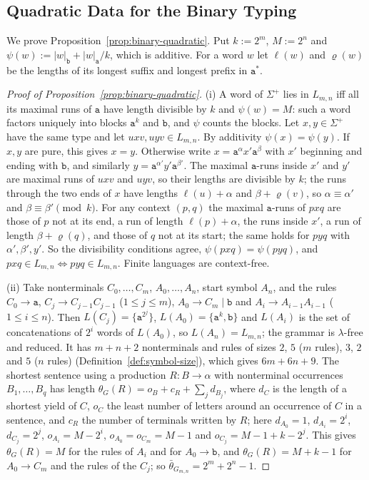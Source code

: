 \documentclass[11pt]{article}
\numberwithin{equation}{section}
\theoremstyle{plain}
\theoremstyle{definition}
\theoremstyle{remark}
\theoremstyle{plain}
\begin{document}
\subsection{Quadratic Data for the Binary Typing}

We prove Proposition~\ref{prop:binary-quadratic}.  Put
$k:=2^m$, $M:=2^n$ and $\psi(w):=|w|_{\mathtt b}+|w|_{\mathtt a}/k$, which is
additive.  For a word $w$ let $\ell(w)$ and $\varrho(w)$ be the lengths of its
longest suffix and longest prefix in $\mathtt a^*$.

\begin{proof}[Proof of Proposition~\ref{prop:binary-quadratic}]
(i) A word of $\Sigma^+$ lies in $L_{m,n}$ iff all its maximal runs of $\mathtt a$
have length divisible by $k$ and $\psi(w)=M$: such a word factors uniquely into
blocks $\mathtt a^k$ and $\mathtt b$, and $\psi$ counts the blocks.  Let
$x,y\in\Sigma^+$ have the same type and let $uxv,uyv\in L_{m,n}$.  By additivity
$\psi(x)=\psi(y)$.  If $x,y$ are pure, this gives $x=y$.  Otherwise write
$x=\mathtt a^{\alpha}x'\mathtt a^{\beta}$ with $x'$ beginning and ending with
$\mathtt b$, and similarly $y=\mathtt a^{\alpha'}y'\mathtt a^{\beta'}$.  The maximal
$\mathtt a$-runs inside $x'$ and $y'$ are maximal runs of $uxv$ and $uyv$, so their
lengths are divisible by $k$; the runs through the two ends of $x$ have lengths
$\ell(u)+\alpha$ and $\beta+\varrho(v)$, so $\alpha\equiv\alpha'$ and
$\beta\equiv\beta'\pmod k$.  For any context $(p,q)$ the maximal $\mathtt a$-runs of
$pxq$ are those of $p$ not at its end, a run of length $\ell(p)+\alpha$, the
runs inside $x'$, a run of length $\beta+\varrho(q)$, and those of $q$ not at its
start; the same holds for $pyq$ with $\alpha',\beta',y'$.  So the divisibility
conditions agree, $\psi(pxq)=\psi(pyq)$, and $pxq\in L_{m,n}\iff pyq\in L_{m,n}$.
Finite languages are context-free.

(ii) Take nonterminals $C_0,\ldots,C_m$, $A_0,\ldots,A_n$, start symbol $A_n$, and the
rules $C_0\to\mathtt a$, $C_j\to C_{j-1}C_{j-1}$ ($1\le j\le m$),
$A_0\to C_m\mid\mathtt b$ and $A_i\to A_{i-1}A_{i-1}$ ($1\le i\le n$).  Then
$L(C_j)=\{\mathtt a^{2^j}\}$, $L(A_0)=\{\mathtt a^k,\mathtt b\}$ and $L(A_i)$ is the
set of concatenations of $2^i$ words of $L(A_0)$, so $L(A_n)=L_{m,n}$; the grammar
is $\lambda$-free and reduced.  It has $m+n+2$ nonterminals and rules of sizes $2$, $5$
($m$ rules), $3$, $2$ and $5$ ($n$ rules) (Definition~\ref{def:symbol-size}),
which gives $6m+6n+9$.  The shortest sentence using a production
$R:B\to\alpha$ with nonterminal occurrences $B_1,\ldots,B_q$ has length $\theta_G(R)=o_B+c_R+\sum_jd_{B_j}$, where
$d_C$ is the length of a shortest yield of $C$, $o_C$ the least number of letters
around an occurrence of $C$ in a sentence, and $c_R$ the number of terminals
written by $R$; here
$d_{A_0}=1$, $d_{A_i}=2^i$, $d_{C_j}=2^j$, $o_{A_i}=M-2^i$, $o_{A_0}=o_{C_m}=M-1$ and
$o_{C_j}=M-1+k-2^j$.  This gives $\theta_G(R)=M$ for the rules of $A_i$ and for
$A_0\to\mathtt b$, and $\theta_G(R)=M+k-1$ for $A_0\to C_m$ and the rules of the
$C_j$; so $\bar\theta_{G_{m,n}}=2^m+2^n-1$.


\end{proof}
\end{document}
